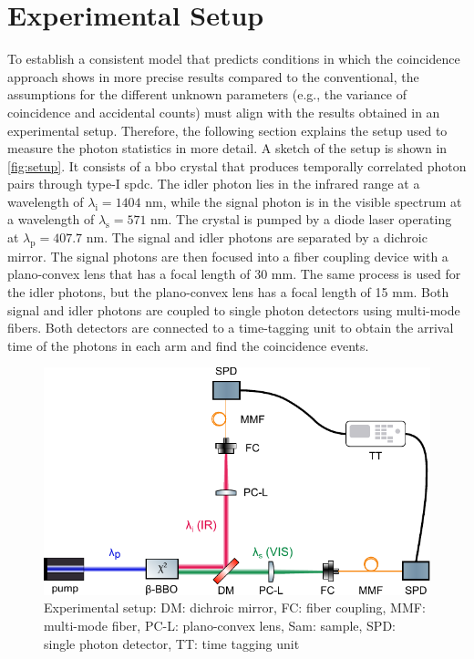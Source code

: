 \section{Experimental Setup}
To establish a consistent model that predicts conditions in which the coincidence approach shows in more precise results compared to the conventional, the assumptions for the different unknown parameters (e.g., the variance of coincidence and accidental counts) must align with the results obtained in an experimental setup. Therefore, the following section explains the setup used to measure the photon statistics in more detail. \newline
A sketch of the setup is shown in \autoref{fig:setup}. It consists of a \acrshort{bbo} crystal that produces temporally correlated photon pairs through type-I \acrshort{spdc}. The idler photon lies in the infrared range at a wavelength of $\lambda_{\text{i}} = 1404$ nm, while the signal photon is in the visible spectrum at a wavelength of $\lambda_{\text{s}} = 571$ nm. The crystal is pumped by a diode laser operating at $\lambda_{\text{p}} = 407.7$ nm. \newline
The signal and idler photons are separated by a dichroic mirror. The signal photons are then focused into a fiber coupling device with a plano-convex lens that has a focal length of 30 mm. The same process is used for the idler photons, but the plano-convex lens has a focal length of 15 mm. \newline
Both signal and idler photons are coupled to single photon detectors using multi-mode fibers. Both detectors are connected to a time-tagging unit to obtain the arrival time of the photons in each arm and find the coincidence events.  
\begin{figure}[tb!]
    \centering
    \includegraphics[width=.8\linewidth]{Images/DupishSetupNew.pdf}
    \caption[Experimental setup]{Experimental setup: DM: dichroic mirror, FC: fiber coupling, MMF: multi-mode fiber, PC-L: plano-convex lens, Sam: sample, SPD: single photon detector, TT: time tagging unit}
    \label{fig:setup}
\end{figure}


